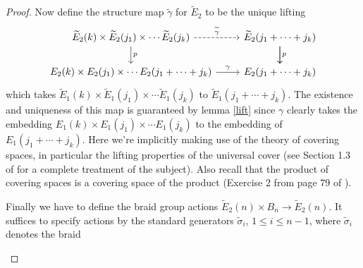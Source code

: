 \documentclass[TFM.tex]{subfiles}
\begin{document}
\begin{proof}
Now define the structure map $\widetilde{\gamma}$ for $\widetilde{E}_2$ to be the unique lifting 
\[
\begin{tikzcd}
\widetilde{E}_2(k)\times\widetilde{E}_2(j_1)\times\cdots\widetilde{E}_2(j_k) \arrow[r, "\widetilde{\gamma}", dashed] \arrow[d, "p"] & \widetilde{E}_2(j_1+\cdots+j_k) \arrow[d, "p"] \arrow[d] \\
E_2(k)\times E_2(j_1)\times\cdots E_2(j_1+\cdots+j_k) \arrow[r, "\gamma"]                                                                      & E_2(j_1+\cdots+j_k)                                     
\end{tikzcd}
\]
which takes $\widetilde{E}_1(k)\times\widetilde{E}_1(j_1)\times\cdots\widetilde{E}_1(j_k)$ to $\widetilde{E}_1(j_1+\cdots+j_k)$. The existence and uniqueness of this map is guaranteed by lemma \ref{lift} since $\gamma$ clearly takes the embedding $E_1(k)\times E_1(j_1)\times\cdots E_1(j_k)$ to the embedding of $E_1(j_1+\cdots+j_k)$. Here we're implicitly making use of the theory of covering spaces, in particular the lifting properties of the universal cover (see Section 1.3 of \cite{Hatcher} for a complete treatment of the subject). Also recall that the product of covering spaces is a covering space of the product (Exercise 2 from page 79 of \cite{Hatcher}).

Finally we have to define the braid group actions $\widetilde{E}_2(n)\times B_n\to\widetilde{E}_2(n)$. It suffices
to specify actions by the standard generators $\widetilde{\sigma}_i$, $1 \leq i \leq n - 1$, where $\widetilde{\sigma}_i$ denotes
the braid

\begin{figure}[h!]
\centering
{}
\end{figure}


\end{proof}
\end{document}
